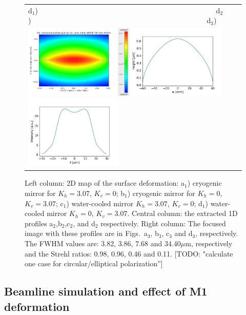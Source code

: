 \documentclass[]{spie}  %
\newcommand{\todo}[1]{{\color{red}[TODO: "#1'']}}
\begin{document}
\begin{figure} [ht]
\begin{center}
\begin{tabular}{l}
   
   d$_1$)~~~~~~~~~~~~~~~~~~~~~~~~~~~~~~~~~~~~~~~~~~~~~~~~~
   d$_2$)~~~~~~~~~~~~~~~~~~~~~~~~~~~~~~~~~~~~~~~~~~~~~~~~~d$_3$)\\
   \includegraphics[height=3.5cm]{figures/water2_2d.png} 
   \includegraphics[height=3.5cm]{figures/deformationwater2_1d.png} 
   \includegraphics[height=3.5cm]{figures/intensitywater2.png}\\
   
   \end{tabular}
  \end{center}
   \caption[example] 
   { \label{fig:M1deformation} 
   Left column: 2D map of the surface deformation: a$_1$) cryogenic mirror for $K_h=3.07$, $K_v=0$; b$_1$) cryogenic mirror for $K_h=0$, $K_v=3.07$; c$_1$) water-cooled mirror $K_h=3.07$, $K_v=0$; d$_1$) water-cooled mirror $K_h=0$, $K_v=3.07$. Central column: the extracted 1D profiles a$_2$,b$_2$,c$_2$, and d$_2$ respectively. Right column: The focused image with these profiles are in Figs.~a$_3$, b$_3$, c$_3$ and d$_3$, respectively. The FWHM values are: 3.82, 3.86, 7.68 and 34.40$\mu$m, respectively and the Strehl ratios: 0.98, 0.96, 0.46 and 0.11.
   \todo{calculate one case for circular/elliptical polarization}
   }
   \end{figure} 


\subsection{Beamline simulation and effect of M1 deformation}
\end{document}
